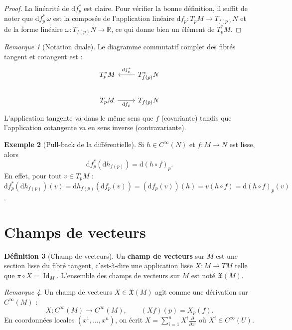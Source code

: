 \documentclass[12pt,a4paper,openany]{book}
\theoremstyle{definition}
\newtheorem{definition}{Définition}[chapter]
\newtheorem{exemple}[definition]{Exemple}
\theoremstyle{plain}
\theoremstyle{remark}
\newtheorem{remarque}[definition]{Remarque}
\newcommand{\R}{\mathbb{R}}
\DeclareMathOperator{\Id}{Id}
\newcommand{\dd}{\mathrm{d}}
\begin{document}
\begin{proof}
La linéarité de $\dd f_p^*$ est claire. Pour vérifier la bonne définition,
il suffit de noter que $\dd f_p^*\,\omega$ est la composée de l'application
linéaire $\dd f_p : T_pM \to T_{f(p)}N$ et de la forme linéaire
$\omega : T_{f(p)}N \to \R$, ce qui donne bien un élément de $T_p^*M$.
\end{proof}

\begin{remarque}[Notation duale]\label{rem:notation-duale}
Le diagramme commutatif complet des fibrés tangent et cotangent est :
\[
\begin{tikzcd}
  T_p^*M & T_{f(p)}^*N \arrow[l, "\dd f_p^*"'] \\
  T_pM \arrow[r, "\dd f_p"'] & T_{f(p)}N
\end{tikzcd}
\]
L'application tangente va dans le même sens que $f$ (covariante) tandis que
l'application cotangente va en sens inverse (contravariante).
\end{remarque}

\begin{exemple}[Pull-back de la différentielle]\label{ex:pullback-diff}
Si $h \in C^\infty(N)$ et $f : M \to N$ est lisse, alors
\[
  \dd f_p^*(\dd h_{f(p)}) = \dd(h \circ f)_p.
\]
En effet, pour tout $v \in T_pM$ :
$\dd f_p^*(\dd h_{f(p)})(v) = \dd h_{f(p)}(\dd f_p(v)) = (\dd f_p(v))(h) = v(h \circ f) = \dd(h \circ f)_p(v)$.
\end{exemple}

\section{Champs de vecteurs}\label{sec:champs-vecteurs}

\begin{definition}[Champ de vecteurs]\label{def:champ-vecteurs}
Un \textbf{champ de vecteurs} sur $M$ est une section lisse
du fibré tangent, c'est-à-dire une application lisse $X : M \to TM$ telle que
$\pi \circ X = \Id_M$. L'ensemble des champs de vecteurs sur $M$ est noté
$\mathfrak{X}(M)$.
\end{definition}

\begin{remarque}\label{rem:champ-derivation}
Un champ de vecteurs $X \in \mathfrak{X}(M)$ agit comme une dérivation sur
$C^\infty(M)$ :
\[
  X : C^\infty(M) \longrightarrow C^\infty(M), \qquad (Xf)(p) = X_p(f).
\]
En coordonnées locales $(x^1, \ldots, x^n)$, on écrit
$X = \sum_{i=1}^n X^i \frac{\partial}{\partial x^i}$ où $X^i \in C^\infty(U)$.
\end{remarque}
\end{document}
